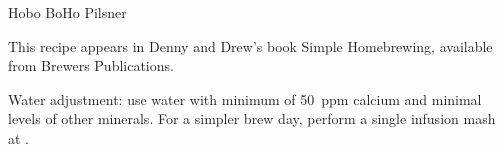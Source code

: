 \stylesection{\styleczechpremiumpalelager}

\begin{recipe}{Hobo BoHo Pilsner}

\begin{aboutblock}
This recipe appears in Denny and Drew's book Simple Homebrewing, available from
Brewers Publications. \sourceaha
\end{aboutblock}


\begin{methodandtiming}
 
\begin{mashsteps}
\mashdecoctboil{}
\mashdecoctboil{}
\end{mashsteps}

\begin{fermentationsteps}
\end{fermentationsteps}

\begin{directions}
Water adjustment: use water with minimum of 50~ppm calcium and minimal levels
of other minerals. For a simpler brew day, perform a single infusion mash at
.
\end{directions}

\end{methodandtiming}

\recipebreak

\begin{ingredientsblock}

\begin{malts}
\end{malts}

\begin{hops}
\end{hops}


\end{ingredientsblock}

\end{recipe}


